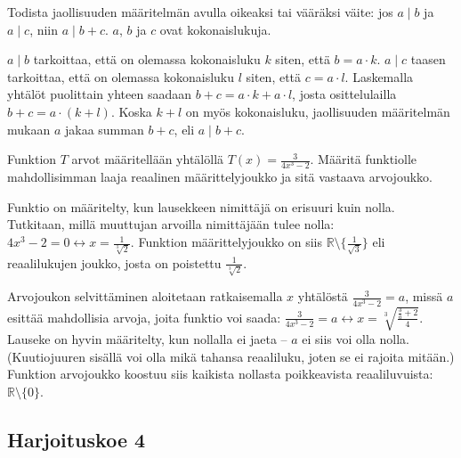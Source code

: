 \begin{tehtava}
Todista jaollisuuden määritelmän avulla oikeaksi tai vääräksi väite: jos $a\mid b$ ja $a\mid c$, niin $a\mid b+c$. $a$, $b$ ja $c$ ovat kokonaislukuja.
	\begin{vastaus}
	$a	\mid b$ tarkoittaa, että on olemassa kokonaisluku $k$ siten, että $b=a\cdot k$. $a \mid c$ taasen tarkoittaa, että on olemassa kokonaisluku $l$ siten, että $c=a\cdot l$. Laskemalla yhtälöt puolittain yhteen saadaan $b+c=a\cdot k + a\cdot l$, josta osittelulailla $b+c=a\cdot (k+l)$. Koska $k+l$ on myös kokonaisluku, jaollisuuden määritelmän mukaan $a$ jakaa summan $b+c$, eli $a\mid b+c$.
	\end{vastaus}
\end{tehtava}	
	
\begin{tehtava}
Funktion $T$ arvot määritellään yhtälöllä $T(x)=\frac{3}{4x^3-2}$. Määritä funktiolle mahdollisimman laaja reaalinen määrittelyjoukko ja sitä vastaava arvojoukko.
	\begin{vastaus}
Funktio on määritelty, kun lausekkeen nimittäjä on erisuuri kuin nolla. Tutkitaan, millä muuttujan arvoilla nimittäjään tulee nolla: $4x^3-2=0 \leftrightarrow x=\frac{1}{\sqrt[3]{2}}$. Funktion määrittelyjoukko on siis $\mathbb{R}\setminus\lbrace\frac{1}{\sqrt{3}} \rbrace$ eli reaalilukujen joukko, josta on poistettu $\frac{1}{\sqrt[3]{2}}$.

Arvojoukon selvittäminen aloitetaan ratkaisemalla $x$ yhtälöstä $\frac{3}{4x^3-2}=a$, missä $a$ esittää mahdollisia arvoja, joita funktio voi saada: $\frac{3}{4x^3-2}=a \leftrightarrow x= \sqrt[3]{\frac{\frac{3}{a}+2}{4}}$. Lauseke on hyvin määritelty, kun nollalla ei jaeta -- $a$ ei siis voi olla nolla. (Kuutiojuuren sisällä voi olla mikä tahansa reaaliluku, joten se ei rajoita mitään.) Funktion arvojoukko koostuu siis kaikista nollasta poikkeavista reaaliluvuista: $\mathbb{R}\setminus \lbrace 0 \rbrace$.
	\end{vastaus}
\end{tehtava}

\newpage	
	
\subsection*{Harjoituskoe 4}

